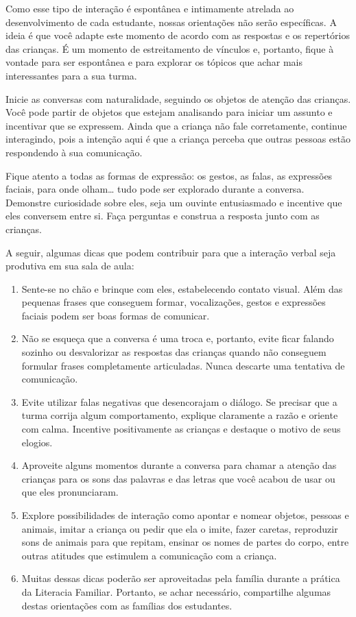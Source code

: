 \documentclass[11pt]{extarticle}
\begin{document}
Como esse tipo de interação é espontânea e intimamente atrelada ao 
desenvolvimento de cada estudante, nossas orientações não serão específicas. 
A ideia é que você adapte este momento de acordo com as respostas e os 
repertórios das crianças. É um momento de estreitamento de vínculos e, portanto, 
fique à vontade para ser espontânea e para explorar os tópicos que achar 
mais interessantes para a sua turma.

Inicie as conversas com naturalidade, seguindo os objetos de atenção das crianças. 
Você pode partir de objetos que estejam analisando
para iniciar um assunto e incentivar que se expressem. Ainda que a
criança não fale corretamente, continue interagindo, 
pois a intenção aqui é que a criança perceba que outras pessoas estão respondendo 
à sua comunicação. 

Fique atento a todas as formas de expressão: os gestos, as falas, as 
expressões faciais, para onde olham\ldots{} tudo pode ser explorado durante a conversa. 
Demonstre curiosidade sobre eles, seja um ouvinte entusiasmado e incentive que eles 
conversem entre si. Faça perguntas e construa a resposta junto com as crianças. 

A seguir, algumas dicas que podem contribuir para que a interação verbal 
seja produtiva em sua sala de aula: 

\begin{enumerate}
\item Sente-se no chão e brinque com eles, estabelecendo 
contato visual. Além das pequenas frases que conseguem formar, vocalizações, 
gestos e expressões faciais podem ser boas formas de comunicar.

\item Não se esqueça que a conversa é uma troca e, portanto, 
evite ficar falando sozinho ou desvalorizar as respostas das 
crianças quando não conseguem formular frases completamente articuladas. 
Nunca descarte uma tentativa de comunicação. 

\item Evite utilizar falas negativas que desencorajam o diálogo. 
Se precisar que a turma 
corrija algum comportamento, explique claramente a razão e 
oriente com calma. Incentive positivamente as crianças e 
destaque o motivo de seus elogios. 

\item Aproveite alguns momentos durante a conversa para chamar 
a atenção das crianças para os sons das palavras e das letras que você 
acabou de usar ou que eles pronunciaram.  

\item Explore possibilidades de interação como apontar e 
nomear objetos, pessoas e animais, imitar a criança ou pedir que 
ela o imite, fazer caretas, reproduzir sons de 
animais para que repitam, ensinar os nomes de partes do corpo, 
entre outras atitudes que estimulem a comunicação com a criança. 

\item Muitas dessas dicas poderão ser aproveitadas pela 
família durante a prática da Literacia Familiar. Portanto, 
se achar necessário, compartilhe algumas destas orientações 
com as famílias dos estudantes.
\end{enumerate}
\end{document}
